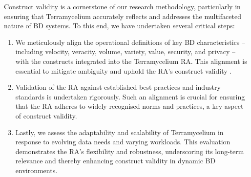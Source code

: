 \documentclass[preprint,12pt]{elsarticle}
\begin{document}
Construct validity is a cornerstone of our research methodology, particularly in ensuring that Terramycelium accurately reflects and addresses the multifaceted nature of BD systems. To this end, we have undertaken several critical steps:

\begin{enumerate}

    \item We meticulously align the operational definitions of key BD characteristics -- including velocity, veracity, volume, variety, value, security, and privacy -- with the constructs integrated into the Terramycelium RA. This alignment is essential to mitigate ambiguity and uphold the RA's construct validity \cite{rad2017big}.

    

    

    \item Validation of the RA against established best practices and industry standards is undertaken rigorously. Such an alignment is crucial for ensuring that the RA adheres to widely recognised norms and practices, a key aspect of construct validity.

    

    \item Lastly, we assess the adaptability and scalability of Terramycelium in response to evolving data needs and varying workloads. This evaluation demonstrates the RA's flexibility and robustness, underscoring its long-term relevance and thereby enhancing construct validity in dynamic BD environments.

\end{enumerate}



\end{document}
